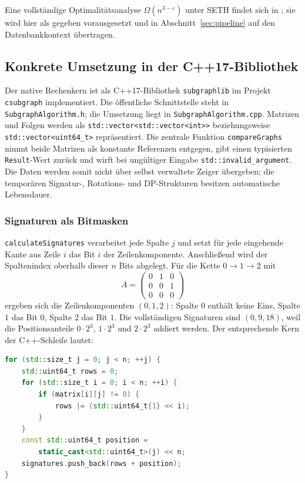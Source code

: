 \documentclass[a4paper,12pt, twoside]{report}
\theoremstyle{definition}
\begin{document}
Eine vollständige Optimalitätsanalyse $\Omega(n^{3-\varepsilon})$ unter SETH findet sich in \cite{epp2026subgraph}; sie wird hier als gegeben vorausgesetzt und in Abschnitt~\ref{sec:pipeline} auf den Datenbankkontext übertragen.

\subsection{Konkrete Umsetzung in der C++17-Bibliothek}
\label{sec:cpp_impl}

Der native Rechenkern ist als C++17-Bibliothek \texttt{subgraphlib} im Projekt \texttt{csubgraph} implementiert. Die öffentliche Schnittstelle steht in \texttt{SubgraphAlgorithm.h}; die Umsetzung liegt in \texttt{SubgraphAlgorithm.cpp}. Matrizen und Folgen werden als \texttt{std::vector<std::vector<int>>} beziehungsweise \texttt{std::vector<uint64\_t>} repräsentiert. Die zentrale Funktion \texttt{compareGraphs} nimmt beide Matrizen als konstante Referenzen entgegen, gibt einen typisierten \texttt{Result}-Wert zurück und wirft bei ungültiger Eingabe \texttt{std::invalid\_argument}. Die Daten werden somit nicht über selbst verwaltete Zeiger übergeben; die temporären Signatur-, Rotations- und DP-Strukturen besitzen automatische Lebensdauer.

\subsubsection*{Signaturen als Bitmasken}

\texttt{calculateSignatures} verarbeitet jede Spalte $j$ und setzt für jede eingehende Kante aus Zeile $i$ das Bit $i$ der Zeilenkomponente. Anschließend wird der Spaltenindex oberhalb dieser $n$ Bits abgelegt. Für die Kette $0\to1\to2$ mit
\[
A=\begin{pmatrix}0&1&0\\0&0&1\\0&0&0\end{pmatrix}
\]
ergeben sich die Zeilenkomponenten $(0,1,2)$: Spalte $0$ enthält keine Eins, Spalte $1$ das Bit $0$, Spalte $2$ das Bit $1$. Die vollständigen Signaturen sind $(0,9,18)$, weil die Positionsanteile $0\cdot 2^3$, $1\cdot 2^3$ und $2\cdot 2^3$ addiert werden. Der entsprechende Kern der C++-Schleife lautet:

\begin{lstlisting}[language=C++, caption={Bitweise Berechnung der Spaltensignaturen}]
for (std::size_t j = 0; j < n; ++j) {
    std::uint64_t rows = 0;
    for (std::size_t i = 0; i < n; ++i) {
        if (matrix[i][j] != 0) {
            rows |= (std::uint64_t{1} << i);
        }
    }
    const std::uint64_t position =
        static_cast<std::uint64_t>(j) << n;
    signatures.push_back(rows + position);
}
\end{lstlisting}
\end{document}
